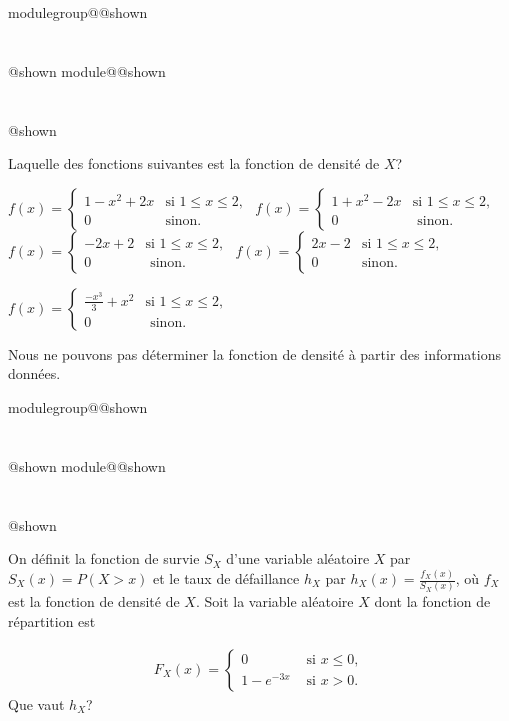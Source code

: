 \documentclass{Evaluation}
\makeatletter
\newcommand{\currentmodulekey}{}
\newcommand{\currentmoduletitle}{}
\newcommand{\currentgroupkey}{}
\newcommand{\currentgrouptitle}{}
\newcommand{\showmoduleifneeded}{%
  \ifx\currentgroupkey\empty\else
    \expandafter\ifx\csname modulegroup@\currentgroupkey @shown\endcsname\relax
      \section*{\currentgrouptitle}%
      \expandafter\gdef\csname modulegroup@\currentgroupkey @shown\endcsname{1}%
    \fi
  \fi
  \expandafter\ifx\csname module@\currentmodulekey @shown\endcsname\relax
    \section*{\currentmoduletitle}%
    \expandafter\gdef\csname module@\currentmodulekey @shown\endcsname{1}%
  \fi
}
\newenvironment{H25}{\showmoduleifneeded}{}
\newenvironment{H26}{\showmoduleifneeded}{}
\makeatother
\begin{document}
\begin{questions}
\begin{H25}
Laquelle des fonctions suivantes est la fonction de densité de $X$?

\begin{checkboxes}
\choice $f(x)=\left\{
			\begin{array}{ll}
   \displaystyle 1-x^2+2x& \text{si } 1\leq x\leq 2, \\
			0 & \mbox{sinon.}
			\end{array}
			\right. $
\correctchoice $ f(x) = \left\{
			\begin{array}{ll}
   \displaystyle 1+x^2-2x& \text{si } 1\leq x\leq 2, \\
			0 & \mbox{ sinon.}
			\end{array}
			\right. $
\choice $ f(x) = \left\{
			\begin{array}{ll}
   \displaystyle -2x+2& \text{si } 1\leq x\leq 2, \\
			0 & \mbox{ sinon.}
			\end{array}
			\right. $
\choice $ f(x) = \left\{
			\begin{array}{ll}
   \displaystyle 2x-2& \text{si } 1\leq x\leq 2, \\
			0 & \mbox{sinon.}
			\end{array}
			\right. $

\choice $ f(x) = \left\{
			\begin{array}{ll}
   \displaystyle \frac{-x^3}{3}+x^2& \text{si } 1\leq x\leq 2, \\
			0 &  \mbox{ sinon. }
			\end{array}
			\right. $


\choice Nous ne pouvons pas déterminer la fonction de densité à partir des informations données.

\end{checkboxes}

\end{H25}

\begin{H26}
\question {} %
On définit la fonction de survie $S_X$ d'une variable aléatoire $X$ par $S_X(x)=P(X>x)$ et le taux de défaillance $h_X$ par $h_X(x)=\displaystyle\frac{f_X(x)}{S_X(x)}$, où $f_X$ est la fonction de densité de $X$.
Soit la variable aléatoire $X$ dont la fonction de répartition est

\begin{align*}
    F_X(x) = \left\{
			\begin{array}{ll}
			0  & \mbox{ si } x\leq 0, \\
			1-e^{-3x} & \mbox{ si } x> 0.
			\end{array}
			\right.
\end{align*}
Que vaut $h_X$?


\end{H26}
\end{questions}
\end{document}
